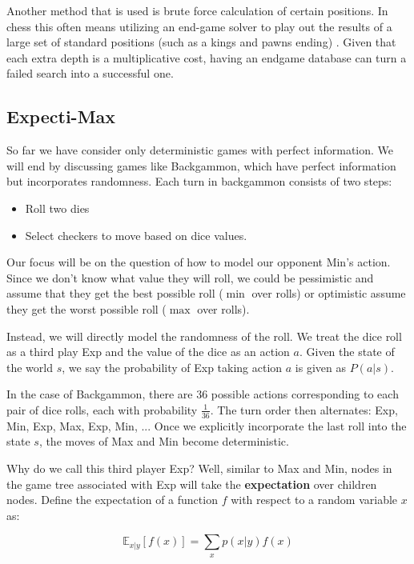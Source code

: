\documentclass[11pt]{article}
\begin{document}
Another method that is used is brute force calculation of certain positions. In chess this often means utilizing an end-game solver to play out the results of a large set of standard positions (such as a kings and pawns ending) . Given that each extra depth is a multiplicative cost, having an endgame database can turn a failed search into a successful one.





\subsection{Expecti-Max}

So far we have consider only deterministic games with perfect information. We will end by discussing games like Backgammon, which have perfect information but incorporates randomness. Each turn in backgammon consists of two steps:

\begin{itemize}
\item Roll two dies
\item Select checkers to move based on dice values. 
\end{itemize}

Our focus will be on the question of how to model our opponent Min's action. Since we don't know what value they will roll, we could be pessimistic and assume that they get the best possible roll ($\min$ over rolls) or optimistic assume they get the worst possible roll ($\max$ over rolls). 


Instead, we will directly model the randomness of the roll. We treat the dice roll as a third play Exp and the value of the dice as an action $a$. Given the state of the world $s$, we say the probability of Exp taking action $a$ is given as $P(a | s)$. 

In the case of Backgammon, there are $36$ possible actions corresponding to each pair of dice rolls, each with probability $\frac{1}{36}$. The turn order then alternates: Exp, Min, Exp, Max, Exp, Min, ...
Once we explicitly incorporate the last roll into the state $s$, the moves of Max and Min become deterministic.  


Why do we call this third player Exp? Well, similar to Max and Min, nodes in the game tree associated with Exp will take the \textbf{expectation} over children nodes. Define the expectation of a function $f$ with respect to a random variable $x$ as:

\[\mathbb{E}_{x|y}[f(x)] = \sum_{x} p(x|y)f(x) \]
\end{document}
